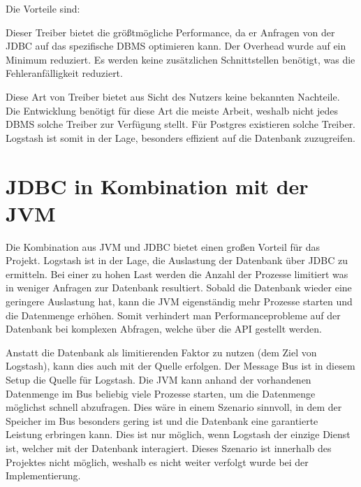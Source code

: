 {Die Vorteile sind:

\begin{outline}
  \1 Dieser Treiber bietet die größtmögliche Performance, da er Anfragen von
  der JDBC auf das spezifische DBMS optimieren kann.
  \1 Der Overhead wurde auf ein Minimum reduziert.
  \1 Es werden keine zusätzlichen Schnittstellen benötigt, was die
  Fehleranfälligkeit reduziert.
\end{outline}

Diese Art von Treiber bietet aus Sicht des Nutzers keine bekannten Nachteile.
Die Entwicklung benötigt für diese Art die meiste Arbeit, weshalb nicht jedes
DBMS solche Treiber zur Verfügung stellt. Für Postgres existieren solche
Treiber. Logstash ist somit in der Lage, besonders effizient auf die Datenbank
zuzugreifen.
\tm%

\section{JDBC in Kombination mit der JVM}
Die Kombination aus JVM und JDBC bietet einen großen Vorteil für das Projekt.
Logstash ist in der Lage, die Auslastung der Datenbank über JDBC zu ermitteln.
Bei einer zu hohen Last werden die Anzahl der Prozesse limitiert was in weniger
Anfragen zur Datenbank resultiert. Sobald die Datenbank wieder eine geringere
Auslastung hat, kann die JVM eigenständig mehr Prozesse starten und die
Datenmenge erhöhen. Somit verhindert man Performanceprobleme auf der Datenbank
bei komplexen Abfragen, welche über die API gestellt werden.

Anstatt die Datenbank als limitierenden Faktor zu nutzen (dem Ziel von
Logstash), kann dies auch mit der Quelle erfolgen. Der Message Bus ist
in diesem Setup die Quelle für Logstash. Die JVM kann anhand der vorhandenen
Datenmenge im Bus beliebig viele Prozesse starten, um die Datenmenge möglichst
schnell abzufragen. Dies wäre in einem Szenario sinnvoll, in dem der Speicher
im Bus besonders gering ist und die Datenbank eine garantierte Leistung
erbringen kann. Dies ist nur möglich, wenn Logstash der einzige Dienst ist,
welcher mit der Datenbank interagiert. Dieses Szenario ist innerhalb des
Projektes nicht möglich, weshalb es nicht weiter verfolgt wurde bei der
Implementierung.
\tm%


}
